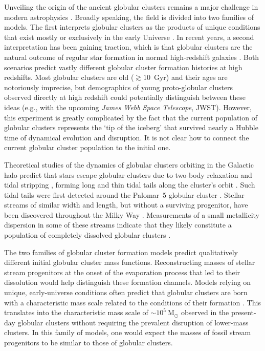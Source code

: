 \documentclass[twocolumn]{aastex63}
\newcommand{\msun}{\ensuremath{\textrm{M}_\odot}}
\begin{document}
Unveiling the origin of the ancient globular clusters remains a major challenge in modern astrophysics \citep[e.g.][]{brodie:2006,kruijssen:2014,forbes:2018,adamo:2020}.
Broadly speaking, the field is divided into two families of models.
The first interprets globular clusters as the products of unique conditions that exist mostly or exclusively in the early Universe \citep[e.g.][]{peebles:1968,fall:1985,ashman:1992,trenti:2015,madau:2020}.
In recent years, a second interpretation has been gaining traction, which is that globular clusters are the natural outcome of regular star formation in normal high-redshift galaxies \citep[e.g.][]{kravtsov:2005,kruijssen15b,pfeffer:2018,keller:2020}.
Both scenarios predict vastly different globular cluster formation histories at high redshifts.
Most globular clusters are old ($\gtrsim10$~Gyr) and their ages are notoriously imprecise, but demographics of young proto-globular clusters observed directly at high redshift could potentially distinguish between these ideas (e.g., with the upcoming \textit{James Webb Space Telescope}, JWST).
However, this experiment is greatly complicated by the fact that the current population of globular clusters represents the `tip of the iceberg' that survived nearly a Hubble time of dynamical evolution and disruption.
It is not clear how to connect the current globular cluster population to the initial one.

Theoretical studies of the dynamics of globular clusters orbiting in the Galactic halo predict that stars escape globular clusters due to two-body relaxation and tidal stripping \citep[often referred to as `evaporation', e.g.,][]{spitzer:1987, baumgardt03}, forming long and thin tidal tails along the cluster's orbit \citep{combes:1999}.
Such tidal tails were first detected around the Palomar~5 globular cluster \citep{odenkirchen:2001, rockosi:2002}.
Stellar streams of similar width and length, but without a surviving progenitor, have been discovered throughout the Milky Way \citep[e.g.,][]{gd:2006, grillmair:2009, bonaca:2012, shipp:2018, ibata:2019}.
Measurements of a small metallicity dispersion in some of these streams indicate that they likely constitute a population of completely dissolved globular clusters \citep{bonaca:2020b, hansen:2020, ji:2020}.

The two families of globular cluster formation models predict qualitatively different initial globular cluster mass functions.
Reconstructing masses of stellar stream progenitors at the onset of the evaporation process that led to their dissolution would help distinguish these formation channels.
Models relying on unique, early-universe conditions often predict that globular clusters are born with a characteristic mass scale related to the conditions of their formation \citep[e.g.][]{peebles:1968,fall:1985,trenti:2015,madau:2020}.
This translates into the characteristic mass scale of $\sim10^5~\msun$ observed in the present-day globular clusters without requiring the prevalent disruption of lower-mass clusters.
In this family of models, one would expect the masses of fossil stream progenitors to be similar to those of globular clusters.
\end{document}
